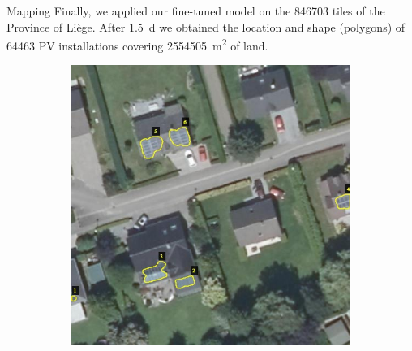 \documentclass[12pt]{beamer}
\begin{document}
\begin{frame}{Mapping}
    Finally, we applied our fine-tuned model on the \alert{\num{846703}} tiles of the \alert{Province of Liège}. After \alert{\SI{1.5}{\day}} we obtained the location and shape (polygons) of \alert{\num{64463}} PV installations covering \alert{\SI{2554505}{\meter\squared}} of land.
\end{frame}

\begin{frame}
    \begin{figure}
        \centering
        \vspace{1em}
    	\begin{subfigure}{0.48\textwidth}
    		\centering
    		\includegraphics[width=\textwidth]{resources/jpg/609483_533144.jpg}
    	\end{subfigure}
    	\hspace{0em}
    	\begin{subfigure}{0.48\textwidth}
    		\centering

\end{subfigure}
\end{figure}
\end{frame}
\end{document}
